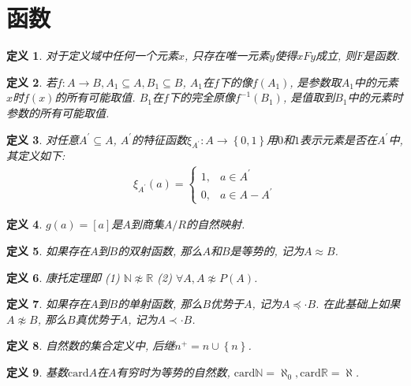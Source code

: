 \documentclass[UTF8,a4paper,11pt]{ctexart}
\newtheorem{definition}{定义}
\begin{document}
  \section{函数}
    \begin{definition}
      对于定义域中任何一个元素$x$, 只存在唯一元素$y$使得$xFy$成立, 则$F$是函数.
    \end{definition}
    \begin{definition}
      若$f:A\to B, A_1\subseteq A, B_1\subseteq B$,
      $A_1$在$f$下的像$f\left(A_1\right)$,
      是参数取$A_1$中的元素$x$时$f\left(x\right)$的所有可能取值.
      $B_1$在$f$下的完全原像$f^{-1}\left(B_1\right)$,
      是值取到$B_1$中的元素时参数的所有可能取值.
    \end{definition}
    \begin{definition}
      对任意$A^{\prime}\subseteq A$, $A^{\prime}$的特征函数$\xi_{A^{\prime}}:A\to \left\{0, 1\right\}$用$0$和$1$表示元素是否在$A^{\prime}$中, 其定义如下:
      \[
      \begin{aligned}
        \xi_{A^{\prime}}\left(a\right)=
        \begin{cases}
          1, &a\in A^{\prime}\\
          0, &a\in A-A^{\prime}
        \end{cases}
      \end{aligned}
      \]
      
    \end{definition}
    \begin{definition}
      $g\left(a\right)=[a]$是$A$到商集$A /R$的自然映射.
    \end{definition}
    \begin{definition}
      如果存在$A$到$B$的双射函数, 那么$A$和$B$是等势的, 记为$A\approx B$.
    \end{definition}
    \begin{definition}
      康托定理即
      (1) $\mathbb{N}\not\approx \mathbb{R}$
      (2) $\forall A, A\not\approx P\left(A\right)$.
    \end{definition}
    \begin{definition}
      如果存在$A$到$B$的单射函数, 那么$B$优势于$A$, 记为$A\preccurlyeq\cdot B$.
      在此基础上如果$A\not\approx B$, 那么$B$真优势于$A$, 记为$A\prec \cdot B$.
    \end{definition}
    \begin{definition}
      自然数的集合定义中, 后继$n^{+}=n\cup \left\{n\right\}$.
    \end{definition}
    \begin{definition}
      基数$\mathrm{card}A$在$A$有穷时为等势的自然数,
      $\mathrm{card}\mathbb{N}=\aleph_0, \mathrm{card}\mathbb{R}=\aleph$.
    \end{definition}
\end{document}
